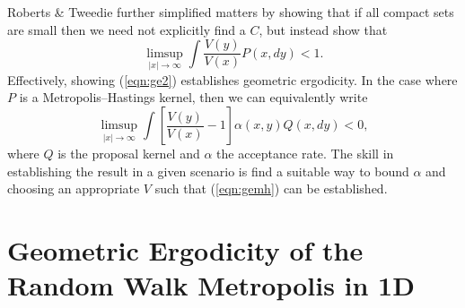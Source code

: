 \documentclass{article}
\begin{document}
Roberts \& Tweedie \cite{} further simplified matters by showing that if all compact sets are small then we need not explicitly find a $C$, but instead show that
\begin{equation} \label{eqn:ge2}
\limsup_{|x| \to \infty} \int \frac{V(y)}{V(x)} P(x,dy) < 1.
\end{equation}
Effectively, showing (\ref{eqn:ge2}) establishes geometric ergodicity.  In the case where $P$ is a Metropolis--Hastings kernel, then we can equivalently write
\begin{equation} \label{eqn:gemh}
\limsup_{|x| \to \infty} \int \left[ \frac{V(y)}{V(x)} - 1 \right] \alpha(x,y)Q(x,dy) < 0,
\end{equation}
where $Q$ is the proposal kernel and $\alpha$ the acceptance rate.  The skill in establishing the result in a given scenario is find a suitable way to bound $\alpha$ and choosing an appropriate $V$ such that (\ref{eqn:gemh}) can be established.

\section{Geometric Ergodicity of the Random Walk Metropolis in 1D}
\end{document}
